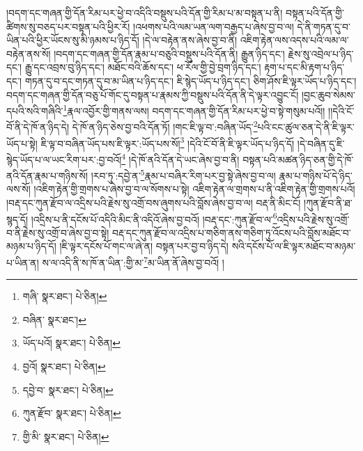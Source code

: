 །བདག་དང་གཞན་གྱི་དོན་རིམ་པར་ཕྱེ་བ་འདིའི་བསྡུས་པའི་དོན་གྱི་རིམ་པ་མ་བསྟན་པ་ནི། བསྟན་པའི་དོན་གྱི་ཚིགས་སུ་བཅད་པར་བསྟན་པའི་ཕྱིར་རོ། །འཕགས་པའི་ལམ་ཡན་ལག་བརྒྱད་པ་ཞེས་བྱ་བ་ལ། དེ་ནི་གཏན་དུ་བ་ཡིན་པའི་ཕྱིར་ཡོངས་སུ་མི་ཉམས་པ་ཉིད་དོ། །དེ་ལ་བརྟེན་ནས་ཞེས་བྱ་བ་ནི། འཇིག་རྟེན་ལས་འདས་པའི་ལམ་ལ་བརྟེན་ནས་སོ། །བདག་དང་གཞན་གྱི་དོན་རྣམ་པ་བཅུའི་བསྡུས་པའི་དོན་ནི། རྒྱུན་ཉིད་དང་། རྗེས་སུ་འབྲེལ་པ་ཉིད་དང་། རྒྱུ་དང་འབྲས་བུ་ཉིད་དང་། མཐོང་བའི་ཆོས་དང་། ཕ་རོལ་གྱི་བྱེ་བྲག་ཉིད་དང་། རྟག་པ་དང་མི་རྟག་པ་ཉིད་དང་། གཏན་དུ་བ་དང་གཏན་དུ་བ་མ་ཡིན་པ་ཉིད་དང་། ཇི་སྙེད་ཡོད་པ་ཉིད་དང་། ཅིག་ཤོས་ཇི་ལྟར་ཡོད་པ་ཉིད་དང་། བདག་དང་གཞན་གྱི་དོན་བཅུ་པོ་གོང་དུ་བསྟན་པ་རྣམས་ཀྱི་བསྡུས་པའི་དོན་ནི་དེ་ལྟར་འབྱུང་ངོ། །བྱང་ཆུབ་སེམས་དཔའི་སའི་གཞིའི་\footnote{གཞི་  སྣར་ཐང་།  པེ་ཅིན། }རྣལ་འབྱོར་གྱི་གནས་ལས། བདག་དང་གཞན་གྱི་དོན་རིམ་པར་ཕྱེ་བ་སྟེ་གསུམ་པའོ།། །།དེའི་ངོ་བོ་ནི་དེ་ཁོ་ན་ཉིད་དེ། དེ་ཁོ་ན་ཉིད་ཅེས་བྱ་བའི་དོན་ཏོ། །གང་ཇི་ལྟ་བ་:བཞིན་ཡོད་\footnote{བཞིན་  སྣར་ཐང་། }པའི་ངང་ཚུལ་ཅན་དེ་ནི་ཇི་ལྟར་ཡོད་པ་སྟེ། ཇི་ལྟ་བ་བཞིན་ཡོད་པས་ཇི་ལྟར་:ཡོད་པས་སོ།\footnote{ཡོད་པའོ།  སྣར་ཐང་།  པེ་ཅིན། } །དེའི་ངོ་བོ་ནི་ཇི་ལྟར་ཡོད་པ་ཉིད་དོ། །དེ་བཞིན་དུ་ཇི་སྙེད་ཡོད་པ་ལ་ཡང་རིག་པར་:བྱ་བའོ།\footnote{བྱའོ།  སྣར་ཐང་།  པེ་ཅིན། } །དེ་ཁོ་ནའི་དོན་དེ་ཡང་ཞེས་བྱ་བ་ནི། བསྟན་པའི་མཚན་ཉིད་ཅན་གྱི་དེ་ཁོ་ནའི་དོན་རྣམ་པ་གཉིས་སོ། །རབ་ཏུ་:དབྱེ་ན་\footnote{དབྱེ་བ་  སྣར་ཐང་།  པེ་ཅིན། }རྣམ་པ་བཞིར་རིག་པར་བྱ་སྟེ་ཞེས་བྱ་བ་ལ། རྣམ་པ་གཉིས་པོ་དེ་ཉིད་ལས་སོ། །འཇིག་རྟེན་གྱི་གྲགས་པ་ཞེས་བྱ་བ་ལ་སོགས་པ་སྟེ། འཇིག་རྟེན་ལ་གྲགས་པ་ནི་འཇིག་རྟེན་གྱི་གྲགས་པའོ། །བརྡ་དང་ཀུན་རྫོབ་ལ་འདྲིས་པའི་རྗེས་སུ་འགྲོ་བས་ཞུགས་པའི་བློས་ཞེས་བྱ་བ་ལ། བརྡ་ནི་མིང་ངོ། །ཀུན་རྫོབ་ནི་ཐ་སྙད་དོ། །འདྲིས་པ་ནི་དངོས་པོ་འདིའི་མིང་ནི་འདིའོ་ཞེས་བྱ་བའོ། །བརྡ་དང་:ཀུན་རྫོབ་ལ་\footnote{ཀུན་རྫོབ་  སྣར་ཐང་།  པེ་ཅིན། }འདྲིས་པའི་རྗེས་སུ་འགྲོ་བ་ནི་རྗེས་སུ་འགྲོ་བ་ཞེས་བྱ་བ་སྟེ། བརྡ་དང་ཀུན་རྫོབ་ལ་འདྲིས་པ་གཅིག་ནས་གཅིག་ཏུ་འོངས་པའི་བློས་མཐོང་བ་མཉམ་པ་ཉིད་དོ། །ཇི་ལྟར་དངོས་པོ་གང་ལ་ཞེ་ན། བསྟན་པར་བྱ་བ་ཉིད་དེ། སའི་དངོས་པོ་ལ་ཇི་ལྟར་མཐོང་བ་མཉམ་པ་ཡིན་ན། ས་ལ་འདི་ནི་ས་ཁོ་ན་ཡིན་:གྱི་མ་\footnote{གྱི་མི་  སྣར་ཐང་།  པེ་ཅིན། }མ་ཡིན་ནོ་ཞེས་བྱ་བའོ། །
